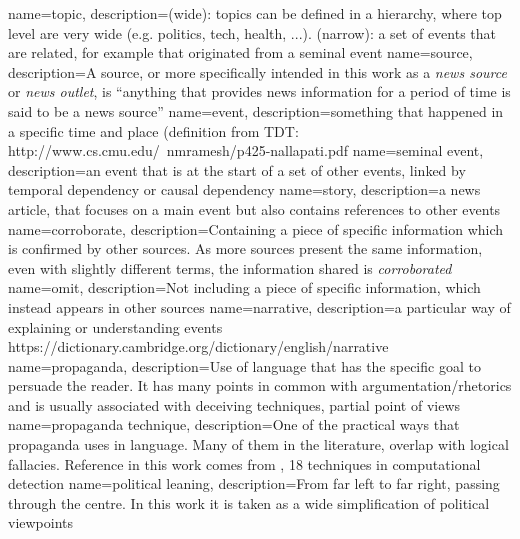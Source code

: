 
{
        name=topic,
        description={(wide): topics can be defined in a hierarchy, where top level are very wide (e.g. politics, tech, health, ...).
        (narrow): a set of events that are related, for example that originated from a seminal event}
}
{
        name=source,
        description={A source, or more specifically intended in this work as a \emph{news source} or \emph{news outlet}, is ``anything that provides news information for a period of time is said to be a news source''}
}
{
        name=event,
        description={something that happened in a specific time and place (definition from TDT: http://www.cs.cmu.edu/~nmramesh/p425-nallapati.pdf}
}
{
        name=seminal event,
        description={an event that is at the start of a set of other events, linked by temporal dependency or causal dependency}
}
{
        name=story,
        description={a news article, that focuses on a main event but also contains references to other events}
}
{
        name=corroborate,
        description={Containing a piece of specific information which is confirmed by other sources. As more sources present the same information, even with slightly different terms, the information shared is \emph{corroborated}}
}
{
        name=omit,
        description={Not including a piece of specific information, which instead appears in other sources}
}
{
        name=narrative,
        description={a particular way of explaining or understanding events 
            https://dictionary.cambridge.org/dictionary/english/narrative
        }
}
{
        name=propaganda,
        description={Use of language that has the specific goal to persuade the reader. It has many points in common with argumentation/rhetorics and is usually associated with deceiving techniques, partial point of views}
}
{
        name=propaganda technique,
        description={One of the practical ways that propaganda uses in language. Many of them in the literature, overlap with logical fallacies. Reference in this work comes from \cite{TODO}, 18 techniques in computational detection}
}
{
        name=political leaning,
        description={From far left to far right, passing through the centre. In this work it is taken as a wide simplification of political viewpoints}
}